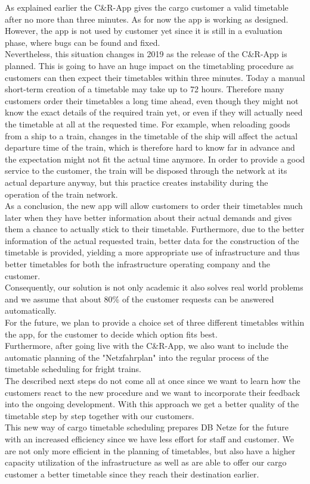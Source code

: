 As explained earlier the C\&R-App gives the cargo customer a valid timetable after no more than three minutes. As for now the app is working as designed. However, the app is not used by customer yet since it is still in a evaluation phase, where bugs can be found and fixed. \\
Nevertheless, this situation changes in 2019 as the release of the C\&R-App is planned. This is going to have an huge impact on the timetabling procedure as customers can then expect their timetables within three minutes. Today a manual short-term creation of a timetable may take up to 72 hours. Therefore many customers order their timetables a long time ahead, even though they might not know the exact details of the required train yet, or even if they will actually need the timetable at all at the requested time.
For example, when reloading goods from a ship to a train, changes in the timetable of the ship will affect the actual departure time of the train, which is therefore hard to know far in advance and the expectation might not fit the actual time anymore. In order to provide a good service to the customer, the train will be disposed through the network at its actual departure anyway, but this practice creates instability during the operation of the train network.\\
As a conclusion, the new app will allow customers to order their timetables much later when they have better information about their actual demands and gives them a chance to actually stick to their timetable. Furthermore, due to the better information of the actual requested train, better data for the construction of the timetable is provided, yielding a more appropriate use of infrastructure and thus better timetables for both the infrastructure operating company and the customer. \\
Consequently, our solution is not only academic it also solves real world problems and we assume that about 80\% of the customer requests can be answered automatically. \\
For the future, we plan to provide a choice set of three different timetables within the app, for the customer to decide which option fits best. \\
Furthermore, after going live with the C\&R-App, we also want to include the automatic planning of the "Netzfahrplan" into the regular process of the timetable scheduling for fright trains. \\
The described next steps do not come all at once since we want to learn how the customers react to the new procedure and we want to incorporate their feedback into the ongoing development. With this approach we get a better quality of the timetable step by step together with our customers. \\
This new way of cargo timetable scheduling prepares DB Netze for the future with an increased efficiency since we have less effort for staff and customer. We are not only more efficient in the planning of timetables, but also have a higher capacity utilization of the infrastructure as well as are able to offer our cargo customer a better timetable since they reach their destination earlier.   \\

